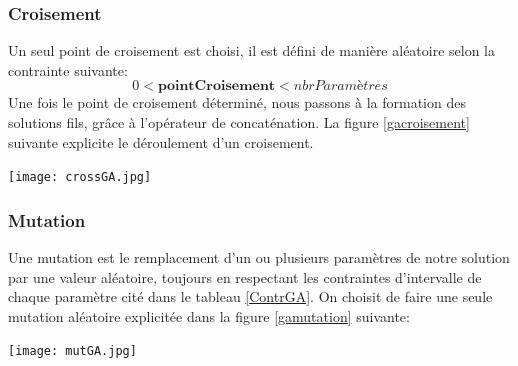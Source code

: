 \subsubsection{Croisement}
Un seul point de croisement est choisi, il est défini de manière aléatoire selon la contrainte suivante:
\begin{equation}
0 < \textbf{pointCroisement} < nbrParamètres
\label{crois}
\end{equation}
Une fois le point de croisement déterminé, nous passons à la formation des solutions fils, grâce à l'opérateur de concaténation.
%
La figure \ref{gacroisement} suivante explicite le déroulement d'un croisement.
\begin{center}	  
	\captionsetup{width=1\linewidth}
	\texttt{[image: crossGA.jpg]}%
	\vspace{-0.1 cm}
	\label{gacroisement}%
\end{center}


\subsubsection{Mutation}
Une mutation est le remplacement d'un ou plusieurs paramètres de notre solution par une valeur aléatoire, toujours en respectant les contraintes d'intervalle de chaque paramètre cité dans le tableau \ref{ContrGA}. On choisit de faire une seule mutation aléatoire explicitée dans la figure \ref{gamutation} suivante:
\begin{center}	  
	\captionsetup{width=1\linewidth}
	\texttt{[image: mutGA.jpg]}%
	\vspace{-0.1 cm}
	\label{gamutation}%
\end{center}



